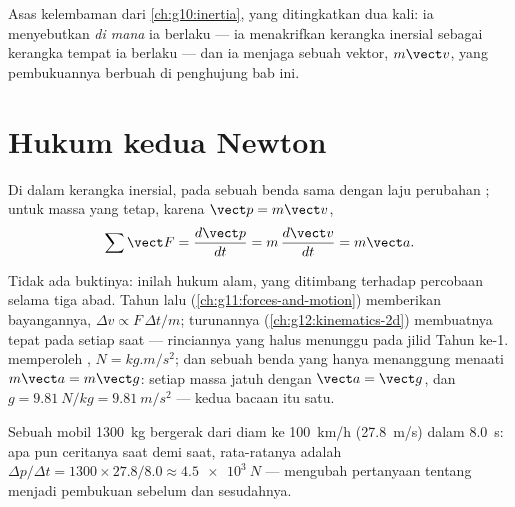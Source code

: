 \begin{remark}\label{rem:g12:newtons-laws:sharpened}
Asas kelembaman dari \cref{ch:g10:inertia}, yang ditingkatkan dua kali: ia menyebutkan
\emph{di mana} ia berlaku --- ia menakrifkan kerangka inersial sebagai kerangka tempat
ia berlaku --- dan ia menjaga sebuah vektor, $m\vect v$, yang pembukuannya berbuah di
penghujung bab ini.
\end{remark}

\section{Hukum kedua Newton}

\begin{theorem}\label{thm:g12:newtons-laws:second}
Di dalam kerangka inersial,  pada sebuah benda sama dengan laju perubahan
; untuk massa yang tetap, karena $\vect p = m\vect v$,
\[
\sum \vect F = \frac{d\vect p}{dt} = m\,\frac{d\vect v}{dt} = m \vect a .
\]
\end{theorem}
\admitted

\begin{remark}\label{rem:g12:newtons-laws:nature}
Tidak ada buktinya: inilah hukum alam, yang ditimbang terhadap percobaan selama tiga
abad. Tahun lalu (\cref{ch:g11:forces-and-motion}) memberikan bayangannya,
$\Delta v \propto F\,\Delta t/m$; turunannya (\cref{ch:g12:kinematics-2d}) membuatnya
tepat pada setiap saat --- rinciannya yang halus menunggu pada jilid Tahun ke-1. 
memperoleh , $\unit{N} = \unit{kg.m/s^2}$; dan sebuah benda yang hanya
menanggung  menaati $m\vect a = m\vect g$: setiap massa jatuh dengan
$\vect a = \vect g$, dan
$g = \qty{9.81}{N/kg} = \qty{9.81}{m/s^2}$ --- kedua bacaan itu satu.
\end{remark}

\begin{example}\label{ex:g12:newtons-laws:average}
Sebuah mobil \qty{1300}{kg} bergerak dari diam ke \qty{100}{km/h} (\qty{27.8}{m/s})
dalam \qty{8.0}{s}: apa pun ceritanya saat demi saat,  rata-ratanya adalah
$\Delta p/\Delta t = 1300 \times 27.8/8.0 \approx \qty{4.5e3}{N}$ ---  mengubah
pertanyaan tentang  menjadi pembukuan sebelum dan sesudahnya.
\end{example}

